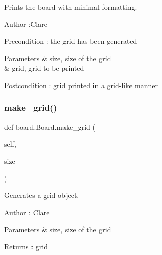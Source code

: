 Prints the board with minimal formatting. 

\begin{DoxyAuthor}{Author}
\+:Clare 
\end{DoxyAuthor}
\begin{DoxyPrecond}{Precondition}
\+: the grid has been generated 
\end{DoxyPrecond}

\begin{DoxyParams}{Parameters}
{\em } & size, size of the grid \\
\hline
{\em } & grid, grid to be printed \\
\hline
\end{DoxyParams}
\begin{DoxyPostcond}{Postcondition}
\+: grid printed in a grid-\/like manner 
\end{DoxyPostcond}
\mbox{\label{classboard_1_1_board_a4ffbe3bf5cb58f50e54bdbfda4a65821}} 
\subsubsection{\texorpdfstring{make\+\_\+grid()}{make\_grid()}}
{\footnotesize\ttfamily def board.\+Board.\+make\+\_\+grid (\begin{DoxyParamCaption}\item[{}]{self,  }\item[{}]{size }\end{DoxyParamCaption})}



Generates a grid object. 

\begin{DoxyAuthor}{Author}
\+: Clare 
\end{DoxyAuthor}

\begin{DoxyParams}{Parameters}
{\em } & size, size of the grid \\
\hline
\end{DoxyParams}
\begin{DoxyReturn}{Returns}
\+: grid 
\end{DoxyReturn}
\mbox{\label{classboard_1_1_board_a1cc112df5b8cc81867534d79f4f7d3a5}} 
